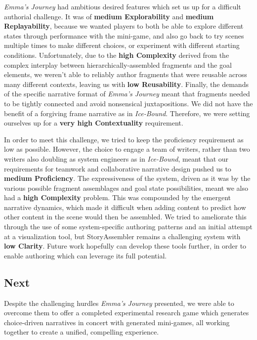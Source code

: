 \textit{Emma's Journey} had ambitious desired features which set us up for a difficult authorial challenge. It was of \textbf{medium Explorability} and \textbf{medium Replayability}, because we wanted players to both be able to explore different states through performance with the mini-game, and also go back to try scenes multiple times to make different choices, or experiment with different starting conditions. Unfortunately, due to the \textbf{high Complexity} derived from the complex interplay between hierarchically-assembled fragments and the goal elements, we weren't able to reliably author fragments that were reusable across many different contexts, leaving us with \textbf{low Reusability}. Finally, the demands of the specific narrative format of \textit{Emma's Journey} meant that fragments needed to be tightly connected and avoid nonsensical juxtapositions. We did not have the benefit of a forgiving frame narrative as in \textit{Ice-Bound}. Therefore, we were setting ourselves up for a \textbf{very high Contextuality} requirement.

In order to meet this challenge, we tried to keep the proficiency requirement as low as possible. However, the choice to engage a team of writers, rather than two writers also doubling as system engineers as in \textit{Ice-Bound}, meant that our requirements for teamwork and collaborative narrative design pushed us to \textbf{medium Proficiency}. The expressiveness of the system, driven as it was by the various possible fragment assemblages and goal state possibilities, meant we also had a \textbf{high Complexity} problem. This was compounded by the emergent narrative dynamics, which made it difficult when adding content to predict how other content in the scene would then be assembled. We tried to ameliorate this through the use of some system-specific authoring patterns and an initial attempt at a visualization tool, but StoryAssembler remains a challenging system with \textbf{low Clarity}. Future work hopefully can develop these tools further, in order to enable authoring which can leverage its full potential.

\subsection{Next}

Despite the challenging hurdles \textit{Emma's Journey} presented, we were able to overcome them to offer a completed experimental research game which generates choice-driven narratives in concert with generated mini-games, all working together to create a unified, compelling experience.

